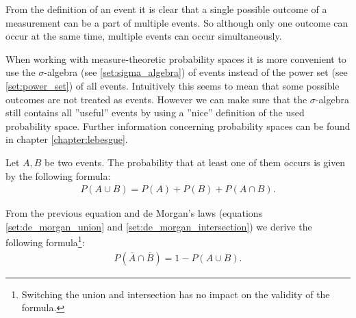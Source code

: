 

	\begin{remark*}
		From the definition of an event it is clear that a single possible outcome of a measurement can be a part of multiple events. So although only one outcome can occur at the same time, multiple events can occur simultaneously.
	\end{remark*}
	\begin{remark*}
		When working with measure-theoretic probability spaces it is more convenient to use the $\sigma$-algebra (see \ref{set:sigma_algebra}) of events instead of the power set (see \ref{set:power_set}) of all events. Intuitively this seems to mean that some possible outcomes are not treated as events. However we can make sure that the $\sigma$-algebra still contains all ''useful'' events by using a ''nice'' definition of the used probability space. Further information concerning probability spaces can be found in chapter \ref{chapter:lebesgue}.
	\end{remark*}

	\begin{formula}[Union]\label{prob:union}
		Let $A, B$ be two events. The probability that at least one of them occurs is given by the following formula:
	        \begin{gather}
        		P(A\cup B) = P(A) + P(B) + P(A\cap B).
		\end{gather}
	\end{formula}


	\begin{result}
		From the previous equation and de Morgan's laws (equations \ref{set:de_morgan_union} and \ref{set:de_morgan_intersection}) we derive the following formula\footnote{Switching the union and intersection has no impact on the validity of the formula.}:
	    	\begin{gather}
			P\left(\overline{A}\cap\overline{B}\right) = 1 - P(A\cup B).
		\end{gather}
    	\end{result}

